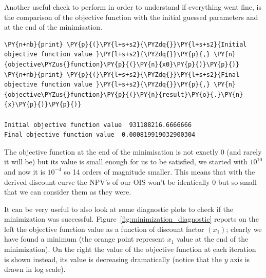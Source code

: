Another useful check to perform in order to understand if everything went fine, is the comparison of the objective function with the initial guessed parameters and at the end of the minimisation.

\begin{tcolorbox}[breakable, size=fbox, boxrule=1pt, pad at break*=1mm,colback=cellbackground, colframe=cellborder]
\begin{Verbatim}[commandchars=\\\{\}]
\PY{n+nb}{print} \PY{p}{(}\PY{l+s+s2}{\PYZdq{}}\PY{l+s+s2}{Initial objective function value }\PY{l+s+s2}{\PYZdq{}}\PY{p}{,} \PY{n}{objective\PYZus{}function}\PY{p}{(}\PY{n}{x0}\PY{p}{)}\PY{p}{)}
\PY{n+nb}{print} \PY{p}{(}\PY{l+s+s2}{\PYZdq{}}\PY{l+s+s2}{Final objective function value }\PY{l+s+s2}{\PYZdq{}}\PY{p}{,} \PY{n}{objective\PYZus{}function}\PY{p}{(}\PY{n}{result}\PY{o}{.}\PY{n}{x}\PY{p}{)}\PY{p}{)}

Initial objective function value  931188216.6666666
Final objective function value  0.000819919032900304
    \end{Verbatim}
\end{tcolorbox}
The objective function at the end of the minimisation is not exactly 0 (and rarely it will be) but its value is small enough for us to be satisfied, we started with $10^{10}$ and now it is $10^{-4}$ so 14 orders of magnitude smaller. This means that with the derived discount curve the NPV's of our OIS won't be identically 0 but so small that we can consider them as they were.

It can be very useful to also look at some diagnostic plots to check if the minimization was successful. Figure~\ref{fig:minimization_diagnostic} reports on the left the objective function value as a function of discount factor $(x_1)$; clearly we have found a minimum (the orange point represent $x_1$ value at the end of the minimization). On the right the value of the objective function at each iteration is shown instead, its value is decreasing dramatically (notice that the $y$ axis is drawn in log scale).

